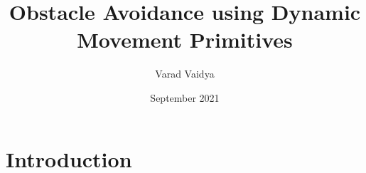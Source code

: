 \documentclass[12pt,A4paper]{report}
\title{Obstacle Avoidance using Dynamic Movement Primitives}
\author{Varad Vaidya}
\date{September 2021}
\begin{document}

\tableofcontents

\chapter{Introduction}

% 
\end{document}
